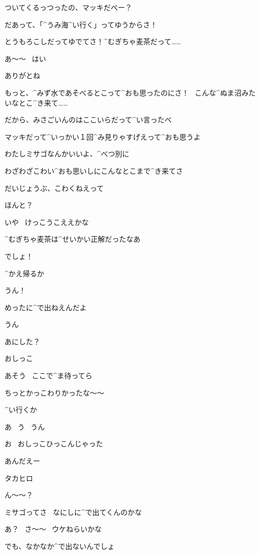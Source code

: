 \Takahiro ついてくるっつったの、マッキだべー？

\Makki だあって、「^{うみ}{海}^{い}{行}く」ってゆうからさ！

\Makki とうもろこしだってゆでてさ！^{むぎちゃ}{麦茶}だって……

\Takahiro あ〜〜
\ はい

\Takahiro ありがとね

\Makki もっと、^{みず}{水}であそべるとこって^{おも}{思}ったのにさ！
\ こんな^{ぬま}{沼}みたいなとこ^{き}{来}て……

\page[104]
\Takahiro だから、みさごいんのはここいらだって^{い}{言}ったべ

\Takahiro マッキだって^{いっかい}{１回}^{み}{見}りゃすげえって^{おも}{思}うよ

\Makki わたしミサゴなんかいいよ、^{べつ}{別}に

\Makki わざわざこわい^{おも}{思}いしにこんなとこまで^{き}{来}てさ

\Takahiro だいじょうぶ、こわくねえって

\Makki ほんと？

\Takahiro いや
\ けっこうこええかな

\page[105]
\Takahiro ^{むぎちゃ}{麦茶}は^{せいかい}{正解}だったなあ

\Makki でしょ！

\page[106]
\Takahiro ^{かえ}{帰}るか

\Makki うん！

\Takahiro めったに^{で}{出}ねえんだよ

\Makki うん

\page[107]
\Takahiro あにした？

\Makki おしっこ

\Takahiro あそう
\ ここで^{ま}{待}ってら

\Makki ちっとかっこわりかったな〜〜

\page[111]
\Takahiro ^{い}{行}くか

\Makki あ
\ う
\ うん

\Makki お
\ おしっこひっこんじゃった

\Takahiro あんだえー

\page[112]
\Makki タカヒロ

\Takahiro ん〜〜？

\Makki ミサゴってさ
\ なにしに^{で}{出}てくんのかな

\Takahiro あ？
\ さ〜〜
\ ウケねらいかな

\Makki でも、なかなか^{で}{出}ないんでしょ

